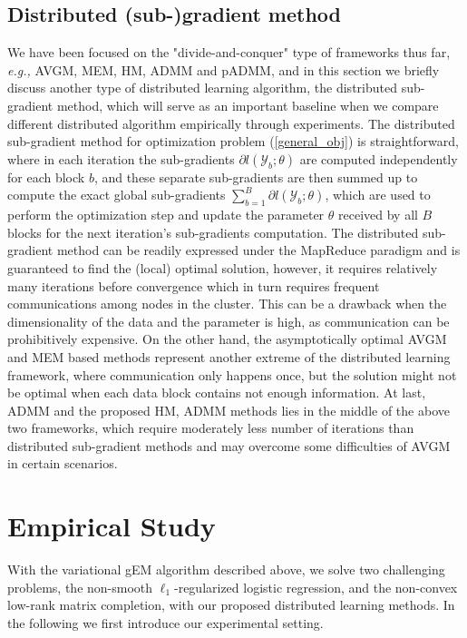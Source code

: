 \documentclass{article}
\newcommand{\eg}[0]{\emph{e.g., }}
\newcommand{\1}[0]{\ensuremath{\boldsymbol{1}}\xspace}
\begin{document}
\subsection{Distributed (sub-)gradient method}
We have been focused on the "divide-and-conquer" type of frameworks thus far, \eg AVGM, MEM, HM, ADMM and pADMM, and in this section we briefly discuss another type of distributed learning algorithm, the distributed sub-gradient method, which will serve as an important baseline when we compare different distributed algorithm empirically through experiments. The distributed sub-gradient method for optimization problem (\ref{general_obj}) is straightforward, where in each iteration the sub-gradients $\partial l(\mathcal{Y}_b; \theta)$ are computed independently for each block $b$, and these separate sub-gradients are then summed up to compute the exact global sub-gradients $\textstyle\sum_{b=1}^B\partial l(\mathcal{Y}_b; \theta)$, which are used to perform the optimization step and update the parameter $\theta$ received by all $B$ blocks for the next iteration's sub-gradients computation. The distributed sub-gradient method can be readily expressed under the MapReduce paradigm \cite{Dean2004} and is guaranteed to find the (local) optimal solution, however, it requires relatively many iterations before convergence which in turn requires frequent communications among nodes in the cluster. This can be a drawback when the dimensionality of the data and the parameter is high, as communication can be prohibitively expensive. On the other hand, the asymptotically optimal AVGM and MEM based methods represent another extreme of the distributed learning framework, where communication only happens once, but the solution might not be optimal when each data block contains not enough information. At last, ADMM and the proposed HM, ADMM methods lies in the middle of the above two frameworks, which require moderately less number of iterations than distributed sub-gradient methods and may overcome some difficulties of AVGM in certain scenarios.


\section{Empirical Study}
With the variational gEM algorithm described above, we solve two challenging problems, the non-smooth $\ell_1$-regularized logistic regression, and the non-convex low-rank matrix completion, with our proposed distributed learning methods. In the following we first introduce our experimental setting.
\end{document}
